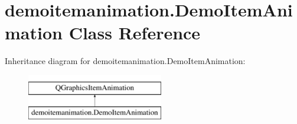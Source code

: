 \hypertarget{classdemoitemanimation_1_1DemoItemAnimation}{}\section{demoitemanimation.\+Demo\+Item\+Animation Class Reference}
\label{classdemoitemanimation_1_1DemoItemAnimation}
Inheritance diagram for demoitemanimation.\+Demo\+Item\+Animation\+:\begin{figure}[H]
\begin{center}
\leavevmode
\includegraphics[height=2.000000cm]{classdemoitemanimation_1_1DemoItemAnimation}
\end{center}
\end{figure}
